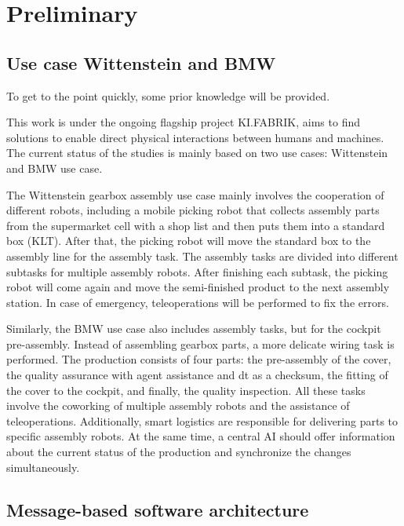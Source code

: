 \chapter{Preliminary} \label{chap: Preliminary}

\section{Use case Wittenstein and BMW}
To get to the point quickly, some prior knowledge will be provided. 

This work is under the ongoing flagship project KI.FABRIK, aims to 
find solutions to enable direct physical interactions between humans and 
machines. The current status of the studies is mainly based on two use 
cases: Wittenstein and BMW use case. 

The Wittenstein gearbox assembly use case mainly involves the cooperation of different 
robots, including a mobile picking robot that collects assembly parts from 
the supermarket cell with a shop list and then puts them into a standard box (KLT). 
After that, the picking robot will move the standard box to the assembly line for 
the assembly task. The assembly tasks are divided into different subtasks for 
multiple assembly robots. After finishing each subtask, the picking robot 
will come again and move the semi-finished product to the next assembly station. 
In case of emergency, teleoperations will be performed to fix the 
errors. 

Similarly, the BMW use case also includes assembly tasks, but for the cockpit 
pre-assembly. Instead of assembling gearbox parts, a more delicate wiring task 
is performed. The production consists of four parts: the pre-assembly of the cover, 
the quality assurance with agent 
assistance and \gls{dt} as a checksum, the fitting of the cover to the cockpit, and 
finally, the quality inspection. All these tasks involve the coworking of 
multiple assembly robots and the assistance of teleoperations. Additionally, 
smart logistics are responsible for delivering parts to 
specific assembly robots. At the same time, a central AI should offer information about the current status of 
the production and synchronize the changes simultaneously. 


\section{Message-based software architecture}

